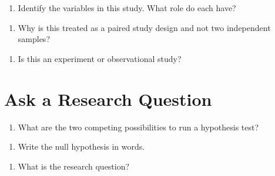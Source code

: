\documentclass[
]{report}
\providecommand{\tightlist}{%
  \setlength{\itemsep}{0pt}\setlength{\parskip}{0pt}}
\begin{document}
\begin{enumerate}
\def\labelenumi{\arabic{enumi}.}
\setcounter{enumi}{1}
\tightlist
\item
  Identify the variables in this study. What role do each have?
\end{enumerate}

\vspace{1in}

\begin{enumerate}
\def\labelenumi{\arabic{enumi}.}
\setcounter{enumi}{2}
\tightlist
\item
  Why is this treated as a paired study design and not two independent samples?
\end{enumerate}

\vspace{1in}

\begin{enumerate}
\def\labelenumi{\arabic{enumi}.}
\setcounter{enumi}{3}
\tightlist
\item
  Is this an experiment or observational study?
\end{enumerate}

\vspace{0.5in}

\hypertarget{ask-a-research-question}{%
\section{Ask a Research Question}\label{ask-a-research-question}}

\begin{enumerate}
\def\labelenumi{\arabic{enumi}.}
\setcounter{enumi}{4}
\tightlist
\item
  What are the two competing possibilities to run a hypothesis test?
\end{enumerate}

\vspace{1in}

\begin{enumerate}
\def\labelenumi{\arabic{enumi}.}
\setcounter{enumi}{5}
\tightlist
\item
  Write the null hypothesis in words.
\end{enumerate}

\vspace{1in}

\begin{enumerate}
\def\labelenumi{\arabic{enumi}.}
\setcounter{enumi}{6}
\tightlist
\item
  What is the research question?
\end{enumerate}
\end{document}
